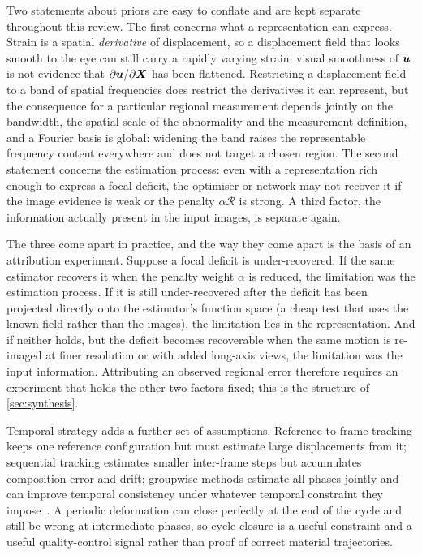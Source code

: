 Two statements about priors are easy to conflate and are kept separate throughout this review.
The first concerns what a representation can express. Strain is a spatial \emph{derivative} of
displacement, so a displacement field that looks smooth to the eye can still carry a rapidly varying
strain; visual smoothness of $\bm{u}$ is not evidence that $\partial\bm{u}/\partial\bm{X}$ has
been flattened. Restricting a displacement field to a band of spatial frequencies does restrict the
derivatives it can represent, but the consequence for a particular regional measurement depends
jointly on the bandwidth, the spatial scale of the abnormality and the measurement definition, and a
Fourier basis is global: widening the band raises the representable frequency content everywhere and
does not target a chosen region. The second statement concerns the estimation process: even with a
representation rich enough to express a focal deficit, the optimiser or network may not recover it
if the image evidence is weak or the penalty $\alpha\mathcal{R}$ is strong. A third factor, the
information actually present in the input images, is separate again.

The three come apart in practice, and the way they come apart is the basis of an attribution
experiment. Suppose a focal deficit is under-recovered. If the same estimator recovers it when the
penalty weight $\alpha$ is reduced, the limitation was the estimation process. If it is still
under-recovered after the deficit has been projected directly onto the estimator's function space
(a cheap test that uses the known field rather than the images), the limitation lies in the
representation. And if neither holds, but the deficit becomes recoverable when the same motion is
re-imaged at finer resolution or with added long-axis views, the limitation was the input
information. Attributing an observed regional error therefore requires an experiment that holds the
other two factors fixed; this is the structure of \cref{sec:synthesis}.

Temporal strategy adds a further set of assumptions. Reference-to-frame tracking keeps one reference
configuration but must estimate large displacements from it; sequential tracking estimates smaller
inter-frame steps but accumulates composition error and drift; groupwise methods estimate all phases
jointly and can improve temporal consistency under whatever temporal constraint they
impose~\citep{metz2011,chen2024}. A periodic deformation can close perfectly at the end of the cycle
and still be wrong at intermediate phases, so cycle closure is a useful constraint and a useful
quality-control signal rather than proof of correct material trajectories.

